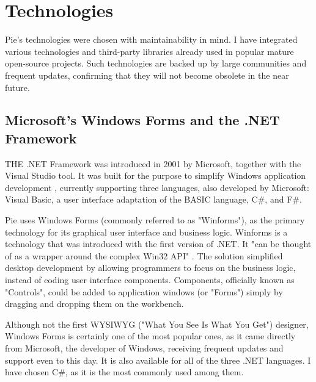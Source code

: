 \chapter{Technologies}
\thispagestyle{pagestyle}

Pie's technologies were chosen with maintainability in mind. I have integrated various technologies and third-party libraries already used in popular mature open-source projects. Such technologies are backed up by large communities and frequent updates, confirming that they will not become obsolete in the near future.

\section{Microsoft's Windows Forms and the .NET Framework}

THE .NET Framework was introduced in 2001 by Microsoft, together with the Visual Studio tool. It was built for the purpose to simplify Windows application development \cite{net-framework}, currently supporting three languages, also developed by Microsoft: Visual Basic, a user interface adaptation of the BASIC language, C\#, and F\#.

Pie uses Windows Forms (commonly referred to as "Winforms"), as the primary technology for its graphical user interface and business logic. Winforms is a technology that was introduced with the first version of .NET. It "can be thought of as a wrapper around the complex Win32 API" \cite{winforms-history}. The solution 
simplified desktop development by allowing programmers to focus on the business logic, instead of coding user interface components. Components, officially known as "Controls", could be added to application windows (or "Forms") simply by dragging and dropping them on the workbench.

Although not the first WYSIWYG ("What You See Is What You Get") designer, Windows Forms is certainly one of the most popular ones, as it came directly from Microsoft, the developer of Windows, receiving frequent updates and support even to this day. It is also available for all of the three .NET languages. I have chosen C\#, as it is the most commonly used among them.

